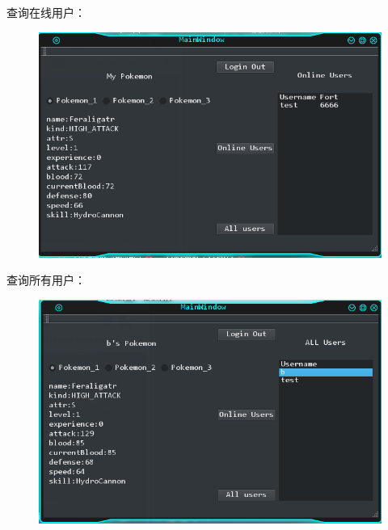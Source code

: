 \documentclass{ctexart}
\begin{document}
查询在线用户：
\begin{figure}[H]
  \centering
  \includegraphics[width=15cm]{stage2-online.png}
\end{figure}
\pagebreak[4]
查询所有用户：
\begin{figure}[H]
  \centering
  \includegraphics[width=15cm]{stage2-alluser.png}
\end{figure}
\end{document}
